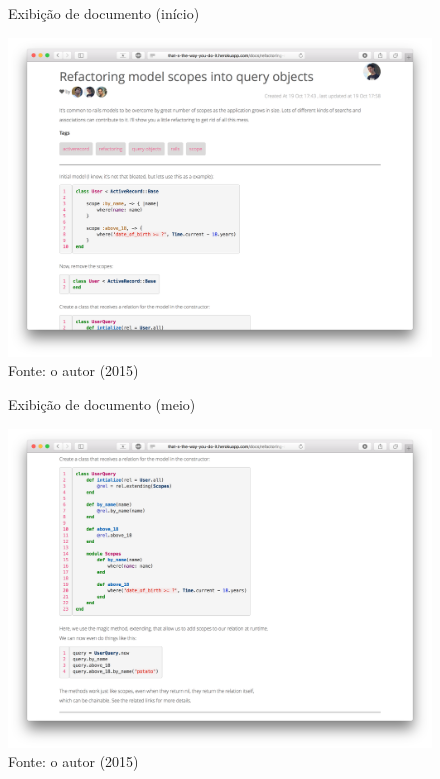 \begin{figure}[h]
	\centering
    \caption{Exibição de documento (início)}
    \includegraphics[width=15cm]{Imagens/print-show-1.png}
	\caption*{Fonte: o autor (2015)}
\end{figure}
\begin{figure}[h]
	\centering
    \caption{Exibição de documento (meio)}
    \includegraphics[width=15cm]{Imagens/print-show-2.png}
	\caption*{Fonte: o autor (2015)}
\end{figure}
